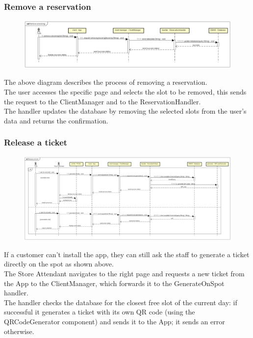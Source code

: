 \documentclass[table, 12pt]{article}
\begin{document}
\subsubsection{Remove a reservation}
\begin{figure}[H]
    \begin{center}
        \includegraphics[width=\textwidth]{assets/Sequence-Diagram/remove-a-booking.png}
    \end{center}
\end{figure}
The above diagram describes the process of removing a reservation.\\
The user accesses the specific page and selects the slot to be removed, this sends the request to the ClientManager and to the ReservationHandler.\\
The handler updates the database by removing the selected slots from the user's data and returns the confirmation. \\
\subsubsection{Release a ticket}
\begin{figure}[H]
    \begin{center}
        \includegraphics[width=\textwidth]{assets/Sequence-Diagram/release-a-ticket.png}
    \end{center}
\end{figure}
If a customer can't install the app, they can still ask the staff to generate a ticket directly on the spot as shown above.\\
The Store Attendant navigates to the right page and requests a new ticket from the App to the ClientManager, which forwards it to the GenerateOnSpot handler.\\
The handler checks the database for the closest free slot of the current day: if successful it generates a ticket with its own QR code (using the QRCodeGenerator component) and sends it to the App; it sends an error otherwise.\\
\end{document}
